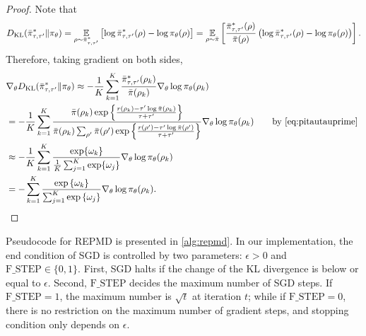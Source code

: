 \begin{proof}
	Note that
	\begin{equation*}
	\label{eq:importance_sampling_kl}
	D_{\mathrm{KL}}(\bar{\pi}_{\tau,\tau^{\prime}}^* \| \pi_\theta) = \operatorname*{\mathbb{E}}_{\rho \sim \bar{\pi}_{\tau,\tau^{\prime}}^* } \left[ \log \bar{\pi}_{\tau,\tau^{\prime}}^*(\rho) - \log \pi_\theta(\rho) \right] = \operatorname*{\mathbb{E}}_{\rho\sim \bar{\pi}} \left[  \frac{\bar{\pi}_{\tau,\tau^{\prime}}^*(\rho)}{\bar{\pi}(\rho)} \left(\log \bar{\pi}_{\tau,\tau^{\prime}}^*(\rho) - \log \pi_\theta(\rho) \right) \right].
	\end{equation*}	
	Therefore, taking gradient on both sides,
	\begin{equation}
	\begin{split}
	&\nabla_{\theta} D_{\mathrm{KL}}(\bar{\pi}_{\tau,\tau^{\prime}}^* \| \pi_\theta) \approx -\frac{1}{K}\sum_{k=1}^K \frac{\bar{\pi}_{\tau,\tau^{\prime}}^* (\rho_k)}{\bar{\pi}(\rho_k)} \nabla_{\theta} \log \pi_\theta(\rho_k)\\ 
	&= -\frac{1}{K}\sum_{k=1}^K \frac{ \bar{\pi}(\rho_k) \exp\left\{ \frac{r(\rho_k)-\tau^{\prime} \log \bar{\pi}(\rho_k) }{ \tau+\tau^{\prime}} \right\} }{\bar{\pi}(\rho_k)  \sum_{\rho^{\prime}}{\bar{\pi}(\rho^{\prime}) \exp\left\{ \frac{r(\rho^{\prime})-\tau^{\prime} \log \bar{\pi}(\rho^{\prime})}{ \tau+\tau^{\prime}} \right\} }  } \nabla_{\theta} \log \pi_\theta(\rho_k) \qquad \text{by \ref{eq:pitautauprime} }  \\
	&\approx -\frac{1}{K}\sum_{k=1}^K \frac{\exp \{\omega_k\}} {\frac{1}{K} \sum_{j=1}^K \exp \{\omega_j\}} \nabla_{\theta} \log \pi_\theta(\rho_k) \\
	&=  -\sum\limits_{k=1}^K{ \frac{ \exp\left\{ \omega_k \right\} }{ \sum_{j=1}^K{ \exp\left\{ \omega_j \right\}}} \nabla_{\theta} \log{\pi_\theta(\rho_k)} } \qedhere.
	\end{split}
	\end{equation}
\end{proof}

Pseudocode for REPMD is presented in \cref{alg:repmd}. In our implementation, the end condition of SGD is controlled by two parameters: $\epsilon > 0$ and $\text{F\_STEP}\in \{0,1 \}$. First, SGD halts if the change of the KL divergence is below or equal to $\epsilon$. Second, $\text{F\_STEP}$ decides the maximum number of SGD steps. If $\text{F\_STEP}=1$, the maximum number is $\sqrt{t}$ at iteration $t$; while if $\text{F\_STEP}=0$, there is no restriction on the maximum number of gradient steps, and stopping condition only depends on $\epsilon$.


